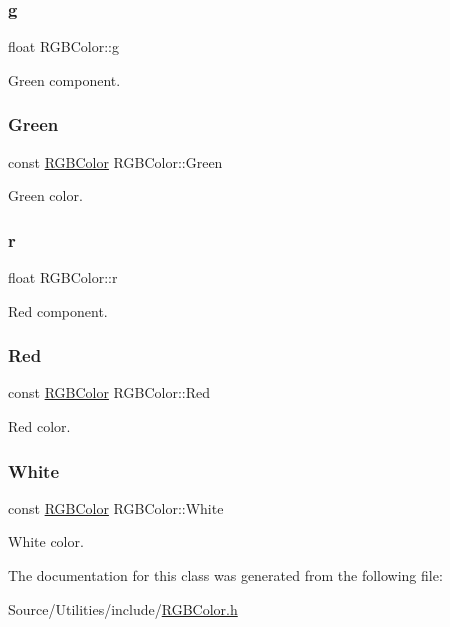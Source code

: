\subsubsection{\texorpdfstring{g}{g}}
{\footnotesize\ttfamily float R\+G\+B\+Color\+::g}

Green component. \hypertarget{class_r_g_b_color_afaabce4b28b3e9306271830bebdfc7ab}{}\label{class_r_g_b_color_afaabce4b28b3e9306271830bebdfc7ab} 
\subsubsection{\texorpdfstring{Green}{Green}}
{\footnotesize\ttfamily const \hyperlink{class_r_g_b_color}{R\+G\+B\+Color} R\+G\+B\+Color\+::\+Green\hspace{0.3cm}{\ttfamily [static]}}

Green color. \hypertarget{class_r_g_b_color_a9c0b69a5100747dc0dee8d151129f8f2}{}\label{class_r_g_b_color_a9c0b69a5100747dc0dee8d151129f8f2} 
\subsubsection{\texorpdfstring{r}{r}}
{\footnotesize\ttfamily float R\+G\+B\+Color\+::r}

Red component. \hypertarget{class_r_g_b_color_a200488d3a3adcd67b66c452973f18c75}{}\label{class_r_g_b_color_a200488d3a3adcd67b66c452973f18c75} 
\subsubsection{\texorpdfstring{Red}{Red}}
{\footnotesize\ttfamily const \hyperlink{class_r_g_b_color}{R\+G\+B\+Color} R\+G\+B\+Color\+::\+Red\hspace{0.3cm}{\ttfamily [static]}}

Red color. \hypertarget{class_r_g_b_color_a2de4286a7090037773a2f3cd98685486}{}\label{class_r_g_b_color_a2de4286a7090037773a2f3cd98685486} 
\subsubsection{\texorpdfstring{White}{White}}
{\footnotesize\ttfamily const \hyperlink{class_r_g_b_color}{R\+G\+B\+Color} R\+G\+B\+Color\+::\+White\hspace{0.3cm}{\ttfamily [static]}}

White color. 

The documentation for this class was generated from the following file\+:\begin{DoxyCompactItemize}
\item 
Source/\+Utilities/include/\hyperlink{_r_g_b_color_8h}{R\+G\+B\+Color.\+h}\end{DoxyCompactItemize}
